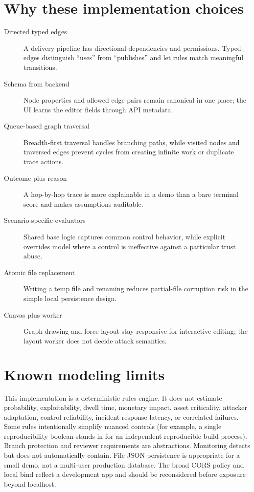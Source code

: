 \documentclass[11pt,oneside]{book}
\begin{document}
\section{Why these implementation choices}
\begin{description}
\item[Directed typed edges] A delivery pipeline has directional dependencies and permissions. Typed edges distinguish ``uses'' from ``publishes'' and let rules match meaningful transitions.
\item[Schema from backend] Node properties and allowed edge pairs remain canonical in one place; the UI learns the editor fields through API metadata.
\item[Queue-based graph traversal] Breadth-first traversal handles branching paths, while visited nodes and traversed edges prevent cycles from creating infinite work or duplicate trace actions.
\item[Outcome plus reason] A hop-by-hop trace is more explainable in a demo than a bare terminal score and makes assumptions auditable.
\item[Scenario-specific evaluators] Shared base logic captures common control behavior, while explicit overrides model where a control is ineffective against a particular trust abuse.
\item[Atomic file replacement] Writing a temp file and renaming reduces partial-file corruption risk in the simple local persistence design.
\item[Canvas plus worker] Graph drawing and force layout stay responsive for interactive editing; the layout worker does not decide attack semantics.
\end{description}

\section{Known modeling limits}
This implementation is a deterministic rules engine. It does not estimate probability, exploitability, dwell time, monetary impact, asset criticality, attacker adaptation, control reliability, incident-response latency, or correlated failures. Some rules intentionally simplify nuanced controls (for example, a single reproducibility boolean stands in for an independent reproducible-build process). Branch protection and reviewer requirements are abstractions. Monitoring detects but does not automatically contain. File JSON persistence is appropriate for a small demo, not a multi-user production database. The broad CORS policy and local bind reflect a development app and should be reconsidered before exposure beyond localhost.
\end{document}
